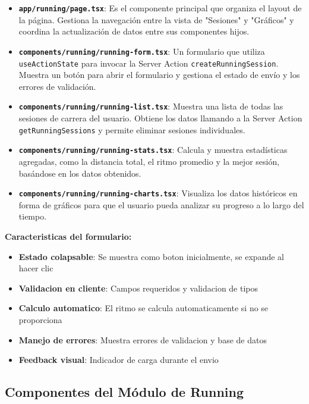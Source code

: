 \documentclass[12pt,a4paper]{article}
\begin{document}
\begin{itemize}
    \item \textbf{\texttt{app/running/page.tsx}}: Es el componente principal que organiza el layout de la página. Gestiona la navegación entre la vista de "Sesiones" y "Gráficos" y coordina la actualización de datos entre sus componentes hijos.
    
    \item \textbf{\texttt{components/running/running-form.tsx}}: Un formulario que utiliza \texttt{useActionState} para invocar la Server Action \texttt{createRunningSession}. Muestra un botón para abrir el formulario y gestiona el estado de envío y los errores de validación.
    
    \item \textbf{\texttt{components/running/running-list.tsx}}: Muestra una lista de todas las sesiones de carrera del usuario. Obtiene los datos llamando a la Server Action \texttt{getRunningSessions} y permite eliminar sesiones individuales.
    
    \item \textbf{\texttt{components/running/running-stats.tsx}}: Calcula y muestra estadísticas agregadas, como la distancia total, el ritmo promedio y la mejor sesión, basándose en los datos obtenidos.
    
    \item \textbf{\texttt{components/running/running-charts.tsx}}: Visualiza los datos históricos en forma de gráficos para que el usuario pueda analizar su progreso a lo largo del tiempo.
\end{itemize}

\textbf{Caracteristicas del formulario:}
\begin{itemize}
    \item \textbf{Estado colapsable}: Se muestra como boton inicialmente, se expande al hacer clic
    \item \textbf{Validacion en cliente}: Campos requeridos y validacion de tipos
    \item \textbf{Calculo automatico}: El ritmo se calcula automaticamente si no se proporciona
    \item \textbf{Manejo de errores}: Muestra errores de validacion y base de datos
    \item \textbf{Feedback visual}: Indicador de carga durante el envio
\end{itemize}

\subsection{Componentes del Módulo de Running}
\end{document}
